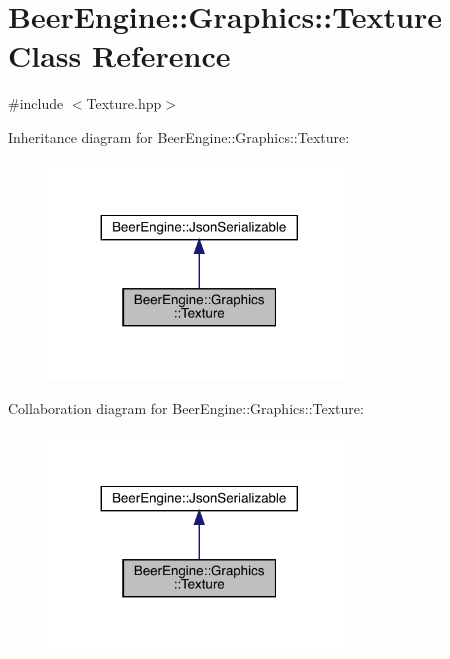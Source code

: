 \hypertarget{class_beer_engine_1_1_graphics_1_1_texture}{}\section{Beer\+Engine\+:\+:Graphics\+:\+:Texture Class Reference}
\label{class_beer_engine_1_1_graphics_1_1_texture}


{\ttfamily \#include $<$Texture.\+hpp$>$}



Inheritance diagram for Beer\+Engine\+:\+:Graphics\+:\+:Texture\+:
\nopagebreak
\begin{figure}[H]
\begin{center}
\leavevmode
\includegraphics[width=227pt]{class_beer_engine_1_1_graphics_1_1_texture__inherit__graph}
\end{center}
\end{figure}


Collaboration diagram for Beer\+Engine\+:\+:Graphics\+:\+:Texture\+:
\nopagebreak
\begin{figure}[H]
\begin{center}
\leavevmode
\includegraphics[width=227pt]{class_beer_engine_1_1_graphics_1_1_texture__coll__graph}
\end{center}
\end{figure}

